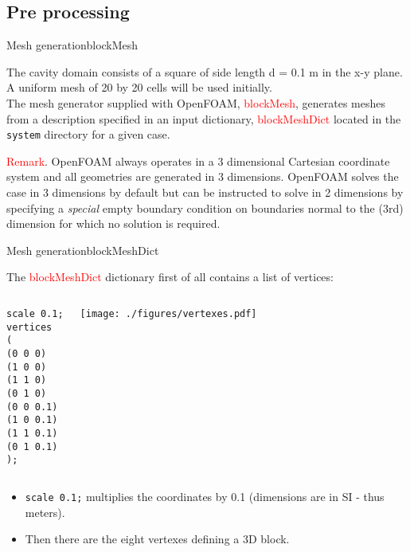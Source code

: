 \documentclass{beamer}
\begin{document}
\subsection{Pre processing}

\begin{frame}{Mesh generation}{blockMesh}

The cavity domain consists of a square of side length d = 0.1 m in the x-y plane.
A uniform mesh of 20 by 20 cells will be used initially.\\[0.3cm]

The mesh generator supplied with OpenFOAM, \textcolor{red}{blockMesh}, generates meshes from a description specified in an input dictionary, \textcolor{red}{blockMeshDict} located in the \texttt{system} directory for a given case. 

\begin{block}

\textcolor{red}{Remark}. OpenFOAM always operates in a 3 dimensional Cartesian coordinate system and all
geometries are generated in 3 dimensions. OpenFOAM solves the case in 3 dimensions
by default but can be instructed to solve in 2 dimensions by specifying a \emph{special} empty boundary condition on boundaries normal to the (3rd) dimension for which no solution is required.
\end{block}

\end{frame}

\begin{frame}[fragile]{Mesh generation}{blockMeshDict}

The \textcolor{red}{blockMeshDict} dictionary first of all contains a list of vertices:
\vspace{-0.4cm}
\begin{columns}[c]

\column{6.0cm} 
\begin{small}
\begin{verbatim}
scale 0.1;
vertices
(
(0 0 0)
(1 0 0)
(1 1 0)
(0 1 0)
(0 0 0.1)
(1 0 0.1)
(1 1 0.1)
(0 1 0.1)
);
\end{verbatim}
\end{small}


\column{5.0cm} 
\begin{center}\texttt{[image: ./figures/vertexes.pdf]}\end{center}
\end{columns}
\vspace{0.2cm}
\begin{itemize}
\item \texttt{scale 0.1;} multiplies the coordinates by 0.1 (dimensions are in SI - thus meters).
\item Then there are the eight vertexes defining a 3D block. 
\end{itemize}

\end{frame}
\end{document}
